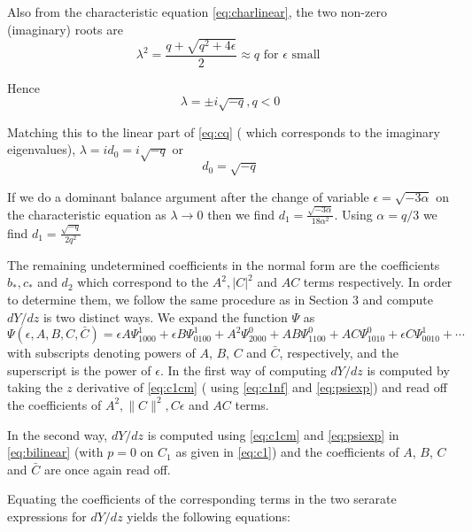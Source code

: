 Also from the characteristic equation \eqref{eq:charlinear}, the two non-zero 
(imaginary) roots are 
\begin{equation}
\lambda^2 = \frac{ q + \sqrt{q^2 + 4 \epsilon } }{2} \approx q \textrm{ for } \epsilon \textrm{ small }
\end{equation}

Hence
\begin{equation}
\lambda = \pm i \sqrt{-q}, q < 0
\end{equation}

Matching this to the linear part of \eqref{eq:cq} ( which corresponds to the imaginary eigenvalues), $\lambda = i d_0 = i \sqrt{-q}$ or 
\begin{equation}
d_0 = \sqrt{-q}
\end{equation}


If we do a dominant balance argument after the change of variable $\epsilon = \sqrt{-3 \alpha}$ on the characteristic equation as $\lambda \rightarrow 0 $ then we find $d_1 = \frac{ \sqrt{-3 \alpha} }{18 \alpha^2 } $. Using $\alpha=q/3$ we find $d_1 = \frac{\sqrt{-q}}{2 q^2} $ 

The remaining undetermined coefficients  in the normal form are the 
coefficients $b_*,c_*$ and $d_2$ 
which correspond to the $A^2, |C|^2$ and $AC$ terms respectively. In 
order to determine them, we follow the same procedure as 
in Section 3 and compute $dY/dz$ is two distinct ways. We expand the
function $\Psi$ as
\begin{equation}\label{eq:psiexp}
\Psi(\epsilon,A,B,C,\bar{C}) = \epsilon A \Psi_{1000}^1 + \epsilon B \Psi_{0100}^1 + A^2 \Psi_{2000}^0 + A B \Psi_{1100}^0 + A C \Psi_{1010}^0 + \epsilon C \Psi_{0010}^1 + \cdots 
\end{equation}
with subscripts denoting powers of $A$, $B$, $C$ and $\bar{C}$, respectively,
and the superscript is the power of $\epsilon$. In the first way of computing
$dY/dz$ is computed by taking the $z$ derivative of \eqref{eq:c1cm} ( 
using \eqref{eq:c1nf} and \eqref{eq:psiexp}) and read off the coefficients
of $A^2, \|C\|^2, C \epsilon$ and $AC$ terms.

In the second way, $dY/dz$ is computed using 
\eqref{eq:c1cm} and \eqref{eq:psiexp} in \eqref{eq:bilinear} 
(with $p=0$ on $C_1$ as given in \eqref{eq:c1})
and the coefficients of  $A$, $B$, $C$ and $\bar{C}$ are once
again read off.

Equating the coefficients of the corresponding terms in the two
serarate expressions for $dY/dz$ yields the following equations:

